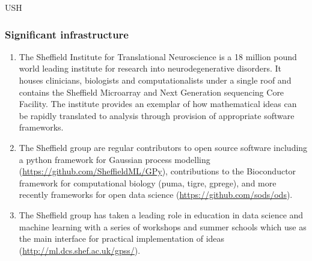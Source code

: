 \begin{sitedescription}{USH}
\subsubsection*{Significant infrastructure}
\begin{enumerate}
\item The Sheffield Institute for Translational Neuroscience is a 18 million pound world leading institute for research into neurodegenerative disorders. It houses clinicians, biologists and computationalists under a single roof and contains the Sheffield Microarray and Next Generation sequencing Core Facility. The institute provides an exemplar of how mathematical ideas can be rapidly translated to analysis through provision of appropriate software frameworks.
\item The Sheffield group are regular contributors to open source software including a python framework for Gaussian process modelling (\url{https://github.com/SheffieldML/GPy}), contributions to the Bioconductor framework for computational biology (puma, tigre, gprege), and more recently frameworks for open data science (\url{https://github.com/sods/ods}).  
\item The Sheffield group has taken a leading role in education in data science and machine learning with a series of workshops and summer schools which use \Jupyter as the main interface for practical implementation of ideas (\url{http://ml.dcs.shef.ac.uk/gpss/}).

\end{enumerate}
\end{sitedescription}


